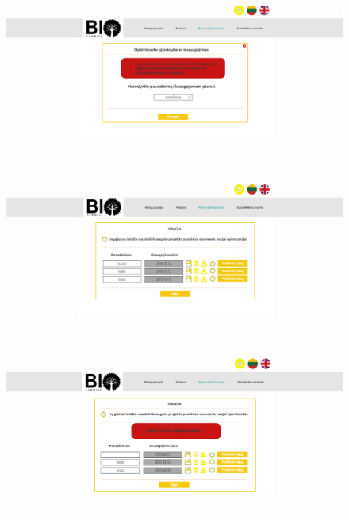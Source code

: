 \documentclass[a4paper,12pt]{article}
\begin{document}
\begin{figure}[!tph]
\hspace{-3cm}
\centering
\includegraphics[scale=0.5]{interfeisai/optimizavimoPuslapisPrisijungusPasirinktoPlanoIsaugojimasSuKlaida}
\label{fig:verticalcell}
\end{figure}



\begin{figure}[!tph]
\hspace{-3cm}
\centering
\includegraphics[scale=0.5]{interfeisai/optimizavimoPuslapisPrisijungusIstorija}
\label{fig:verticalcell}
\end{figure}


\begin{figure}[!tph]
\hspace{-3cm}
\centering
\includegraphics[scale=0.5]{interfeisai/optimizavimoPuslapisPrisijungusIstorijaSuKlaida}
\label{fig:verticalcell}
\end{figure}
\end{document}
